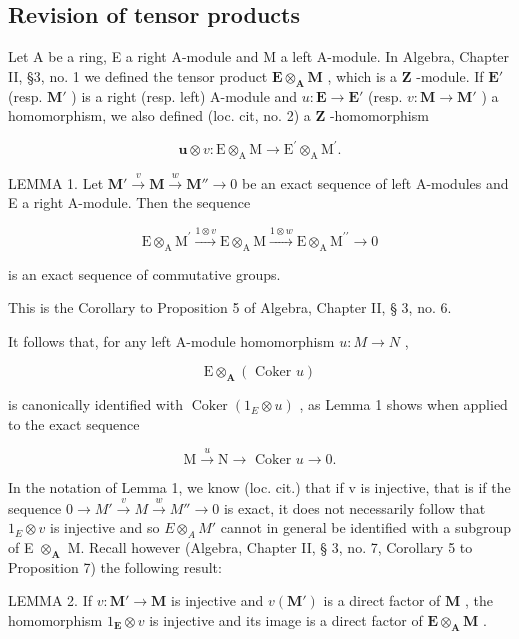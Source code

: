 \subsection{Revision of tensor products}

Let A be a ring, E a right A-module and M a left A-module. In Algebra, Chapter II, §3, no. 1 we defined the tensor product \(\mathbf{E} \otimes_{\mathbf{A}} \mathbf{M}\) , which is a \(\mathbf{Z}\) -module. If \(\mathbf{E}'\) (resp. \(\mathbf{M}'\) ) is a right (resp. left) A-module and \(u: \mathbf{E} \to \mathbf{E}'\) (resp. \(v: \mathbf{M} \to \mathbf{M}'\) ) a homomorphism, we also defined (loc. cit, no. 2) a \(\mathbf{Z}\) -homomorphism

\[
\boldsymbol {u} \otimes v: \mathrm{E} \otimes_ {\mathrm{A}} \mathrm{M} \rightarrow \mathrm{E} ^ {\prime} \otimes_ {\mathrm{A}} \mathrm{M} ^ {\prime}.
\]

LEMMA 1. Let \(\mathbf{M}' \xrightarrow{v} \mathbf{M} \xrightarrow{w} \mathbf{M}'' \to 0\) be an exact sequence of left A-modules and E a right A-module. Then the sequence

\[
\mathrm{E} \otimes_ {\mathrm{A}} \mathrm{M} ^ {\prime} \xrightarrow {1 \otimes v} \mathrm{E} \otimes_ {\mathrm{A}} \mathrm{M} \xrightarrow {1 \otimes w} \mathrm{E} \otimes_ {\mathrm{A}} \mathrm{M} ^ {\prime \prime} \longrightarrow 0
\]

is an exact sequence of commutative groups.

This is the Corollary to Proposition 5 of Algebra, Chapter II, § 3, no. 6.

It follows that, for any left A-module homomorphism \(u: M \rightarrow N\) ,

\[
\mathrm{E} \otimes_ {\mathbf {A}} (\text { Coker } u)
\]

is canonically identified with \(\operatorname{Coker}(1_{E} \otimes u)\) , as Lemma 1 shows when applied to the exact sequence

\[
\mathrm{M} \xrightarrow {u} \mathrm{N} \longrightarrow \text { Coker } u \longrightarrow 0.
\]

In the notation of Lemma 1, we know (loc. cit.) that if v is injective, that is if the sequence \(0 \rightarrow M' \stackrel{v}{\rightarrow} M \stackrel{w}{\rightarrow} M'' \rightarrow 0\) is exact, it does not necessarily follow that \(1_{E} \otimes v\) is injective and so \(E \otimes_{A} M'\) cannot in general be identified with a subgroup of E \(\otimes_{\mathbf{A}}\) M. Recall however (Algebra, Chapter II, § 3, no. 7, Corollary 5 to Proposition 7) the following result:

LEMMA 2. If \(v: \mathbf{M}' \to \mathbf{M}\) is injective and \(v(\mathbf{M}')\) is a direct factor of \(\mathbf{M}\) , the homomorphism \(1_{\mathbf{E}} \otimes v\) is injective and its image is a direct factor of \(\mathbf{E} \otimes_{\mathbf{A}} \mathbf{M}\) .

